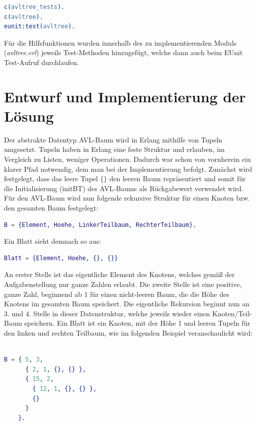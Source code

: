 \documentclass{article}
\begin{document}
\begin{lstlisting}[language=erlang]
c(avltree_tests).
c(avltree).
eunit:test(avltree).
\end{lstlisting}

	Für die Hilfsfunktionen wurden innerhalb des zu implementierenden Moduls (\textit{avltree.erl}) jeweils Test-Methoden hinzugefügt, welche dann auch beim EUnit Test-Aufruf durchlaufen.
  
  \newpage
  \section{Entwurf und Implementierung der Lösung}
  	Der abstrakte Datentyp AVL-Baum wird in Erlang mithilfe von Tupeln umgesetzt. Tupeln haben in Erlang eine feste Struktur und erlauben, im Vergleich zu Listen, weniger Operationen. Dadurch war schon von vornherein ein klarer Pfad notwendig, dem man bei der Implementierung befolgt. Zunächst wird festgelegt, dass das leere Tupel $\{\}$ den leeren Baum repräsentiert und somit für die Initialisierung (initBT) des AVL-Baums als Rückgabewert verwendet wird. 
    \newline
    Für den AVL-Baum wird nun folgende rekursive Struktur für einen Knoten bzw. den gesamten Baum festgelegt:
    
\begin{lstlisting}[language=erlang]
B = {Element, Hoehe, LinkerTeilbaum, RechterTeilbaum}.
\end{lstlisting}
    
    Ein Blatt sieht demnach so aus:
    
\begin{lstlisting}[language=erlang]
Blatt = {Element, Hoehe, {}, {}}
\end{lstlisting}
    
	An erster Stelle ist das eigentliche Element des Knotens, welches gemäß der Aufgabenstellung nur ganze Zahlen erlaubt. Die zweite Stelle ist eine positive, ganze Zahl, beginnend ab 1 für einen nicht-leeren Baum, die die Höhe des Knotens im gesamten Baum speichert. Die eigentliche Rekursion beginnt nun an 3. und 4. Stelle in dieser Datenstruktur, welche jeweils wieder einen Knoten/Teil-Baum speichern. Ein Blatt ist ein Knoten, mit der Höhe 1 und leeren Tupeln für den linken und rechten Teilbaum, wie im folgenden Beispiel veranschaulicht wird:

    \begin{lstlisting}[language=erlang]

B = { 5, 3, 
      { 2, 1, {}, {} }, 
      { 15, 2, 
        { 12, 1, {}, {} }, 
        {}
      }
    }.

    \end{lstlisting}
    
\end{document}
